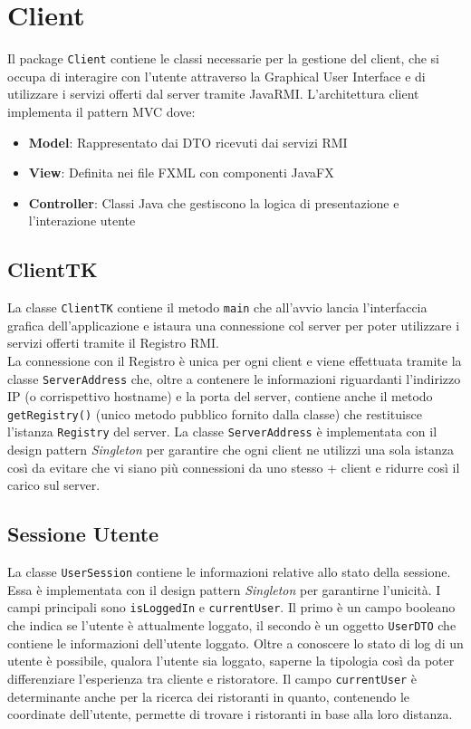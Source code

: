 \section{Client}
Il package \texttt{Client} contiene le classi necessarie per
la gestione del client, che si occupa di interagire con l'utente 
attraverso la Graphical User Interface e di utilizzare i 
servizi offerti dal server tramite JavaRMI.
L'architettura client implementa il pattern MVC dove:
\begin{itemize}
    \item \textbf{Model}: Rappresentato dai DTO ricevuti dai servizi RMI
    \item \textbf{View}: Definita nei file FXML con componenti JavaFX
    \item \textbf{Controller}: Classi Java che gestiscono la logica di presentazione e l'interazione utente
\end{itemize}

\subsection{ClientTK}
La classe \texttt{ClientTK} contiene il metodo \texttt{main}
che all'avvio lancia l'interfaccia grafica dell'applicazione e 
istaura una connessione col server per poter utilizzare i servizi 
offerti tramite il Registro RMI.\\
La connessione con il Registro è unica per ogni client e 
viene effettuata tramite la classe \texttt{ServerAddress} che, 
oltre a contenere le informazioni riguardanti l'indirizzo IP (o 
corrispettivo hostname) e la porta del server, contiene anche il metodo
\texttt{getRegistry()} (unico metodo pubblico fornito dalla classe) 
che restituisce l'istanza \texttt{Registry} del server.
La classe \texttt{ServerAddress} è implementata con il design pattern 
\textit{Singleton} per garantire che ogni client ne utilizzi una sola 
istanza così da evitare che vi siano più connessioni da uno stesso +
client e ridurre così il carico sul server.

\subsection{Sessione Utente}
La classe \texttt{UserSession} contiene le informazioni relative
allo stato della sessione.
Essa è implementata con il design pattern \textit{Singleton} 
per garantirne l'unicità.
I campi principali sono \texttt{isLoggedIn} e \texttt{currentUser}.
Il primo è un campo booleano che indica se l'utente è 
attualmente loggato, il secondo è un oggetto \texttt{UserDTO} che 
contiene le informazioni dell'utente loggato.
Oltre a conoscere lo stato di log di un utente è possibile, 
qualora l'utente sia loggato, saperne la tipologia così da 
poter differenziare l'esperienza tra cliente e ristoratore.
Il campo \texttt{currentUser} è determinante anche per la ricerca
dei ristoranti in quanto, contenendo le coordinate dell'utente, 
permette di trovare i ristoranti in base alla loro distanza.

